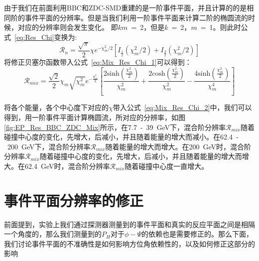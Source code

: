 由于我们在前面利用BBC和ZDC-SMD重建的是一阶事件平面，并且计算的的是相同阶的事件平面的分辨率。但是当我们利用一阶事件平面来计算二阶的椭圆流的时候，对应的分辨率则会发生变化。
即$km$~=~2，但是$k$~=~2，$m$~=~1。则此时公式~\ref{eq:Res_Chi}变换为:
\begin{equation}
\label{eq:Mix_Res_Chi_1}
\mathcal{R}_{n} = \frac{\sqrt{\pi}}{2}\chi e^{-\chi_{m}^2/2} \left[ I_{\frac{1}{2}}(\chi_{m}^2/2) + I_{\frac{3}{2}}(\chi_{m}^2/2) \right]
\end{equation}
将修正贝塞尔函数带入公式~\ref{eq:Mix_Res_Chi_1}可以得到：
\begin{equation}
\label{eq:Mix_Res_Chi_2}
\mathcal{R}_{mix} = \frac{\sqrt{2}}{2}\chi_{m} \sqrt{\chi_{m}^2} e^{-\frac{\chi_{m}^2}{2}}  \left[ \frac{2\mathrm{sinh}(\frac{\chi_{m}^2}{2})}{\chi_{m}^2} + \frac{2\mathrm{cosh}(\frac{\chi_{m}^2}{2})}{\chi_{m}^2} - \frac{4\mathrm{sinh}(\frac{\chi_{m}^2}{2})}{\chi_{m}^4} \right]
\end{equation}

将各个能量，各个中心度下对应的$\chi$带入公式~\ref{eq:Mix_Res_Chi_2}中，我们可以得到，用一阶事件平面计算椭圆流，所对应的分辨率，如图\ref{fig:EP_Res_BBC_ZDC_Mix}所示，在7.7~-~39~GeV下，混合阶分辨率$\mathcal{R}_{mix}$随着碰撞中心度的变化，先增大，后减小，并且随着能量的增大而减小。在62.4~-~200~GeV下，混合阶分辨率$\mathcal{R}_{mix}$随着能量的增大而增大。在200~GeV时，混合阶分辨率$\mathcal{R}_{mix}$随着碰撞中心度的变化，先增大，后减小，并且随着能量的增大而增大。在62.4~GeV时，混合阶分辨率$\mathcal{R}_{mix}$随着碰撞中心度一直增大。




\section{事件平面分辨率的修正}
前面提到，实验上我们通过探测器测量到的事件平面和真实的反应平面之间是相隔一个角度的，那么我们测量到的$P_{H}$对于$\phi-\Psi$的依赖也是需要修正的。那么下面，我们讨论事件平面的不准确性是如何影响方位角依赖性的，以及如何修正这部分的影响

